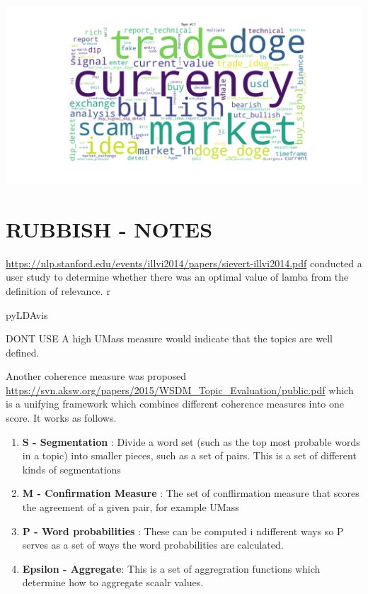 \documentclass[
]{article}
\providecommand{\tightlist}{%
  \setlength{\itemsep}{0pt}\setlength{\parskip}{0pt}}
\begin{document}
\pagebreak

\includegraphics{images/03 - Topic_17.png}

\pagebreak

\hypertarget{rubbish---notes}{%
\section{RUBBISH - NOTES}\label{rubbish---notes}}

\url{https://nlp.stanford.edu/events/illvi2014/papers/sievert-illvi2014.pdf}
conducted a user study to determine whether there was an optimal value
of lamba from the definition of relevance. r

pyLDAvis

DONT USE A high UMass measure would indicate that the topics are well
defined.

Another coherence measure was proposed
\url{https://svn.aksw.org/papers/2015/WSDM_Topic_Evaluation/public.pdf}
which is a unifying framework which combines different coherence
measures into one score. It works as follows.

\begin{enumerate}
\def\labelenumi{\arabic{enumi}.}
\tightlist
\item
  \textbf{S - Segmentation} : Divide a word set (such as the top most
  probable words in a topic) into smaller pieces, such as a set of
  pairs. This is a set of different kinds of segmentations
\item
  \textbf{M - Confirmation Measure} : The set of conffirmation measure
  that scores the agreement of a given pair, for example UMass
\item
  \textbf{P - Word probabilities} : These can be computed i ndifferent
  ways so P serves as a set of ways the word probabilities are
  calculated.
\item
  \textbf{Epsilon - Aggregate}: This is a set of aggregration functions
  which determine how to aggregate scaalr values.
\end{enumerate}
\end{document}
